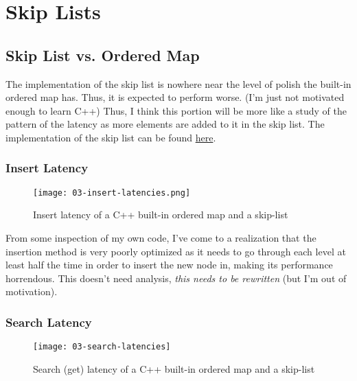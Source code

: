 \section{Skip Lists}

\subsection{Skip List vs. Ordered Map}

\begin{tcolorbox}[title=Disclaimer]
	The implementation of the skip list is nowhere near the level of polish the built-in ordered map has. Thus, it is expected to perform worse. (I'm just not motivated enough to learn C++) Thus, I think this portion will be more like a study of the pattern of the latency as more elements are added to it in the skip list. The implementation of the skip list can be found \href{https://github.com/nngerncham/cs315_apal/tree/main/assignments/asn01/03-skip-list}{here}.
\end{tcolorbox}

\subsubsection{Insert Latency}
\begin{figure}[H]
	\begin{center}
		\texttt{[image: 03-insert-latencies.png]}
		\caption{Insert latency of a C++ built-in ordered map and a skip-list}
		\label{fig:03-insert-latency}
	\end{center}
\end{figure}

From some inspection of my own code, I've come to a realization that the insertion method is very poorly optimized as it needs to go through each level at least half the time in order to insert the new node in, making its performance horrendous. This doesn't need analysis, \textit{this needs to be rewritten} (but I'm out of motivation).

\begingroup

\subsubsection{Search Latency}
\begin{figure}[H]
	\begin{center}
		\texttt{[image: 03-search-latencies]}
		\caption{Search (get) latency of a C++ built-in ordered map and a skip-list}
		\label{fig:03-search-latency}
	\end{center}
\end{figure}

